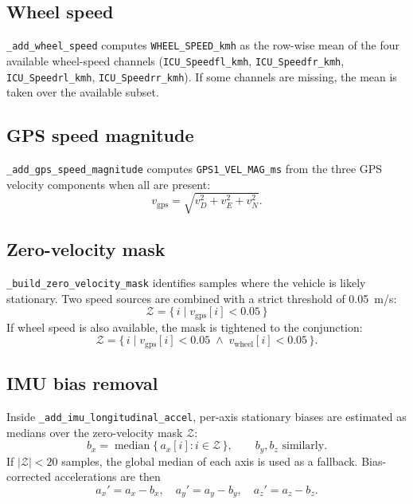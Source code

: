 \documentclass[11pt,a4paper]{article}
\begin{document}
\subsection{Wheel speed}
\texttt{\_add\_wheel\_speed} computes \texttt{WHEEL\_SPEED\_kmh} as the
row-wise mean of the four available wheel-speed channels
(\texttt{ICU\_Speedfl\_kmh}, \texttt{ICU\_Speedfr\_kmh},
\texttt{ICU\_Speedrl\_kmh}, \texttt{ICU\_Speedrr\_kmh}).  If some channels are
missing, the mean is taken over the available subset.

\subsection{GPS speed magnitude}
\texttt{\_add\_gps\_speed\_magnitude} computes \texttt{GPS1\_VEL\_MAG\_ms}
from the three GPS velocity components when all are present:
\[
  v_\text{gps} = \sqrt{ v_D^2 + v_E^2 + v_N^2 }.
\]

\subsection{Zero-velocity mask}
\texttt{\_build\_zero\_velocity\_mask} identifies samples where the vehicle is
likely stationary.  Two speed sources are combined with a strict threshold of
\SI{0.05}{m/s}:
\[
  \mathcal{Z} = \{\, i \mid v_\text{gps}[i] < 0.05 \,\}
\]
If wheel speed is also available, the mask is tightened to the conjunction:
\[
  \mathcal{Z} = \{\, i \mid v_\text{gps}[i] < 0.05 \;\land\; v_\text{wheel}[i] < 0.05 \,\}.
\]

\subsection{IMU bias removal}
Inside \texttt{\_add\_imu\_longitudinal\_accel}, per-axis stationary biases are
estimated as medians over the zero-velocity mask $\mathcal{Z}$:
\[
  b_x = \operatorname{median}\{\, a_x[i] : i \in \mathcal{Z} \,\},
  \qquad b_y, b_z \text{ similarly}.
\]
If $|\mathcal{Z}| < 20$ samples, the global median of each axis is used as a
fallback.  Bias-corrected accelerations are then
\[
  a_x' = a_x - b_x,\quad a_y' = a_y - b_y,\quad a_z' = a_z - b_z.
\]
\end{document}
